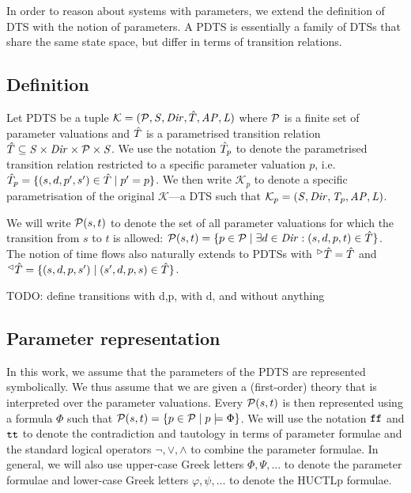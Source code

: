 In order to reason about systems with parameters, we extend the definition of \ac{DTS} with the notion of parameters. A \ac{PDTS} is essentially a family of \acp{DTS} that share the same state space, but differ in terms of transition relations. 

\subsection{Definition}

Let \acl{PDTS} be a tuple $\mathcal{K} = (\mathcal{P}, \mathit{S}, \mathit{Dir}, \hat{T}, \mathit{AP}, \mathit{L})$  where $\mathcal{P}$ is a finite set of parameter valuations and $\hat{T}$ is a parametrised transition relation $\hat{T} \subseteq \mathit{S} \times \mathit{Dir} \times \mathcal{P} \times \mathit{S}$. We use the notation $\hat{T}_p$ to denote the parametrised transition relation restricted to a specific parameter valuation $p$, i.e. $\hat{T}_p = \{ (s, d, p', s') \in \hat{T} \mid p' = p \}$.  We then write $\mathcal{K}_p$ to denote a specific parametrisation of the original $\mathcal{K}$—a \ac{DTS} such that $\mathcal{K}_p = (\mathit{S}, \mathit{Dir}, \mathit{T}_p, \mathit{AP}, \mathit{L})$. 

We will write $\mathcal{P}(s, t)$ to denote the set of all parameter valuations for which the transition from $s$ to $t$ is allowed: $\mathcal{P}(s, t) = \{ p \in \mathcal{P} \mid \exists d \in \mathit{Dir} : (s, d, p, t) \in \hat{T} \}$. The notion of time flows also naturally extends to \acp{PDTS} with ${}^\vartriangleright\hat{T} = \hat{T}$ and ${}^\vartriangleleft\hat{T} = \{ (s, d, p, s') \mid (s', d, p, s) \in \hat{T} \}$.

TODO: define transitions with d,p, with d, and without anything

\subsection{Parameter representation}
\label{sec:paramRepresentation}

In this work, we assume that the parameters of the \ac{PDTS} are represented symbolically. We thus assume that we are given a (first-order) theory that is interpreted over the parameter valuations. Every $\mathcal{P}(s, t)$ is then represented using a formula $\Phi$ such that $\mathcal{P}(s, t) = \{ p \in \mathcal{P} \mid p \models \Phi \}$. We will use the notation $\texttt{ff}$ and $\texttt{tt}$ to denote the contradiction and tautology in terms of parameter formulae and the standard logical operators $\neg, \lor, \land$ to combine the parameter formulae. In general, we will also use upper-case Greek letters $\Phi, \Psi, ...$ to denote the parameter formulae and lower-case Greek letters $\varphi, \psi, ...$ to denote the \ac{HUCTLp} formulae.

